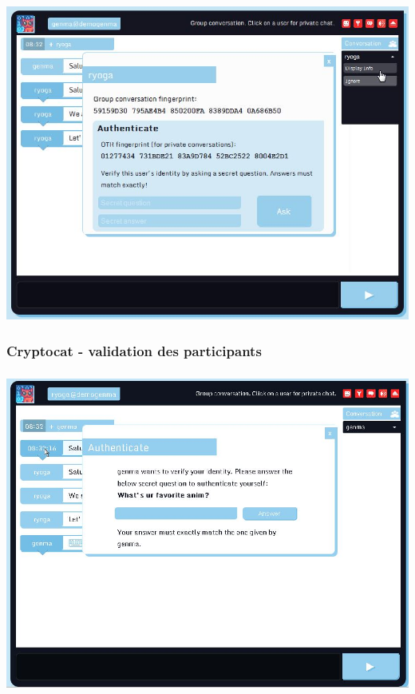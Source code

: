 \documentclass{beamer}
\begin{document}
\begin{frame}
\frametitle{}
\begin{center}
\includegraphics[scale=0.5] {./images/Cryptocat10.jpg} 
\end{center}
\end{frame}

\begin{frame}
\frametitle{Cryptocat - validation des participants}

\begin{itemize}
\end{itemize}	
\end{frame}

\begin{frame}
\frametitle{}
\begin{center}
\includegraphics[scale=0.5] {./images/Cryptocat11.jpg} 
\end{center}
\end{frame}
\end{document}
